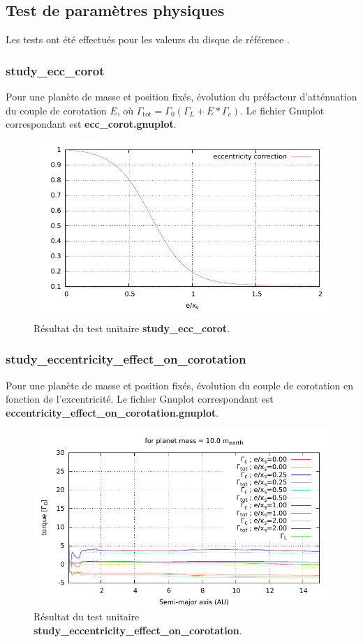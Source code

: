 \subsection{Test de paramètres physiques}
Les tests ont été effectués pour les valeurs du disque de référence .

\subsubsection{study\_ecc\_corot}
Pour une planète de masse et position fixés, évolution du préfacteur d'atténuation du couple de corotation $E$, où $\Gamma_\text{tot}=\Gamma_0 (\Gamma_L + E * \Gamma_c)$. Le fichier Gnuplot correspondant est \textbf{ecc\_corot.gnuplot}. 

\begin{figure}[htbp]
\centering
\includegraphics[width=0.65\linewidth]{figure/unitary_tests/ecc_corot.pdf}
\caption{Résultat du test unitaire \textbf{study\_ecc\_corot}.}
\end{figure}

\subsubsection{study\_eccentricity\_effect\_on\_corotation}
Pour une planète de masse et position fixés, évolution du couple de corotation en fonction de l'excentricité. Le fichier Gnuplot correspondant est \textbf{eccentricity\_effect\_on\_corotation.gnuplot}. 

\begin{figure}[htbp]
\centering
\includegraphics[width=0.65\linewidth]{figure/unitary_tests/eccentricity_effect_on_corotation.pdf}
\caption{Résultat du test unitaire \textbf{study\_eccentricity\_effect\_on\_corotation}.}
\end{figure}

